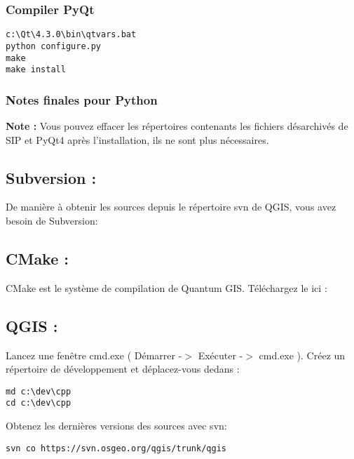 \subsubsection{Compiler PyQt}
\begin{verbatim}
c:\Qt\4.3.0\bin\qtvars.bat 
python configure.py 
make 
make install 
\end{verbatim}

\subsubsection{Notes finales pour Python}

\textbf{Note :} Vous pouvez effacer les r\'epertoires contenants les fichiers d\'esarchiv\'es de SIP et PyQt4 apr\`es l'installation, ils ne sont plus n\'ecessaires.

\subsection{Subversion :}
De mani\`ere \`a obtenir les sources depuis le r\'epertoire svn de QGIS, vous avez besoin de Subversion:


\subsection{CMake :}
CMake est le syst\`eme de compilation de Quantum GIS. T\'el\'echargez le ici :


\subsection{QGIS :}
Lancez une fen\^etre cmd.exe ( D\'emarrer -$>$ Ex\'ecuter -$>$ cmd.exe ). Cr\'eez un r\'epertoire de d\'eveloppement et d\'eplacez-vous dedans :

\begin{verbatim}
md c:\dev\cpp 
cd c:\dev\cpp 
\end{verbatim}

Obtenez les derni\`eres versions des sources avec svn:

\begin{verbatim}
svn co https://svn.osgeo.org/qgis/trunk/qgis 
\end{verbatim}


